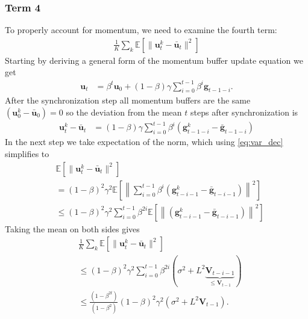 \documentclass[10pt,twocolumn,letterpaper]{article}
\begin{document}
\subsubsection{Term 4}
To properly account for momentum, we need to examine the fourth term:
\begin{align*}
    \frac{1}{K}\sum_k\mathbb{E}\left[\|\mathbf{u}_t^k - \bar{\mathbf{u}}_t \|^2\right]
\end{align*}
Starting by deriving a general form of the momentum buffer update equation we get
\begin{align*}
    \mathbf{u}_{t} &= \beta^t \mathbf{u}_0 + (1-\beta)\gamma \sum_{i=0}^{t-1} \beta^{i} \mathbf{g}_{t-1-i}.
\end{align*}
After the synchronization step all momentum buffers are the same $\left(\mathbf{u}_0^k - \bar{\mathbf{u}}_0 \right) = 0$ so the deviation from the mean $t$ steps after synchronization is
\begin{align*}
    \mathbf{u}_{t}^k - \bar{\mathbf{u}}_{t} &= (1-\beta)\gamma \sum_{i=0}^{t-1} \beta^{i} \left(\mathbf{g}_{t-1-i}^k - \bar{\mathbf{g}}_{t-1-i} \right)
\end{align*}
In the next step we take expectation of the norm, which using \ref{eq:var_dec} simplifies to
\begin{align*}
    &\mathbb{E}\left[\|\mathbf{u}_{t}^k - \bar{\mathbf{u}}_{t}\|^2\right]\\
    &=  (1-\beta)^2\gamma^2 \mathbb{E}\left[\left\|\sum_{i=0}^{t-1} \beta^{i} \left(\mathbf{g}_{t-i-1}^k - \bar{\mathbf{g}}_{t-i-1} \right)\right\|^2\right] \\
    &\leq (1-\beta)^2\gamma^2 \sum_{i=0}^{t-1} \beta^{2i} \mathbb{E}\left[\left\|\left(\mathbf{g}_{t-i-1}^k - \bar{\mathbf{g}}_{t-i-1} \right)\right\|^2\right]
\end{align*}
Taking the mean on both sides gives
\begin{align*}
    &\frac{1}{K}\sum_k\mathbb{E}\left[\|\mathbf{u}_{t}^k - \bar{\mathbf{u}}_{t}\|^2\right]\\
    &\leq  (1-\beta)^2\gamma^2 \sum_{i=0}^{t-1} \beta^{2i} (\sigma^2+ L^2 \underbrace{\mathbf{V}_{t-i-1}}_{\leq \mathbf{V}_{t-1}} ) \\
    &\leq \frac{(1-\beta^{2t})}{(1-\beta^2)}(1-\beta)^2\gamma^2 \left(\sigma^2+ L^2 \mathbf{V}_{t-1} \right).
\end{align*}
\end{document}
